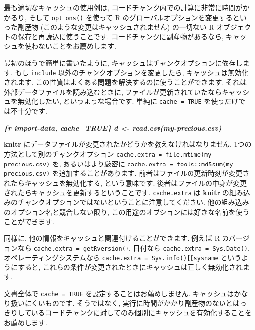 \documentclass[
  11pt,
]{bxjsreport}
\newenvironment{Shaded}{\begin{snugshade}}{\end{snugshade}}
\newcommand{\InformationTok}[1]{\textcolor[rgb]{0.56,0.35,0.01}{\textbf{\textit{#1}}}}
\begin{document}
最も適切なキャッシュの使用例は, コードチャンク内での計算に非常に時間がかかるり, そして \texttt{options()} を使って R のグローバルオプションを変更するといった副産物 (このような変更はキャッシュされません) の一切ない R オブジェクトの保存と再読込に使うことです. コードチャンクに副産物があるなら, キャッシュを使わないことをお薦めします.

最初のほうで簡単に書いたように, キャッシュはチャンクオプションに依存します. もし \texttt{include} 以外のチャンクオプションを変更したら, キャッシュは無効化されます. この性質はよくある問題を解決するのに使うことができます. それは外部データファイルを読み込むときに, ファイルが更新されていたならキャッシュを無効化したい, というような場合です. 単純に \texttt{cache = TRUE} を使うだけでは不十分です.

\begin{Shaded}
\begin{Highlighting}[]
\InformationTok{\textasciigrave{}\textasciigrave{}\textasciigrave{}\{r import{-}data, cache=TRUE\}}
\InformationTok{d \textless{}{-} read.csv(\textquotesingle{}my{-}precious.csv\textquotesingle{})}
\InformationTok{\textasciigrave{}\textasciigrave{}\textasciigrave{}}
\end{Highlighting}
\end{Shaded}

\textbf{knitr} にデータファイルが変更されたかどうかを教えなければなりません. 1つの方法として別のチャンクオプション \texttt{cache.extra = file.mtime(\textquotesingle{}my-precious.csv\textquotesingle{})} を, あるいはより厳密に \texttt{cache.extra = tools::md5sum(\textquotesingle{}my-precious.csv\textquotesingle{})} を追加することがあります. 前者はファイルの更新時刻が変更されたらキャッシュを無効化する, という意味です. 後者はファイルの中身が変更されたらキャッシュを更新するということです. \texttt{cache.extra} は \textbf{knitr} の組み込みのチャンクオプションではないということに注意してください. 他の組み込みのオプション名と競合しない限り, この用途のオプションには好きな名前を使うことができます.

同様に, 他の情報をキャッシュと関連付けることができます. 例えば R のバージョンなら \texttt{cache.extra = getRversion()}, 日付なら \texttt{cache.extra = Sys.Date()}, オペレーティングシステムなら \texttt{cache.extra = Sys.info(){[}{[}\textquotesingle{}sysname\textquotesingle{}{]}{]}} というようにすると, これらの条件が変更されたときにキャッシュは正しく無効化されます.

文書全体で \texttt{cache = TRUE} を設定することはお薦めしません. キャッシュはかなり扱いにくいものです. そうではなく, 実行に時間がかかり副産物のないとはっきりしているコードチャンクに対してのみ個別にキャッシュを有効化することをお薦めします.
\end{document}
